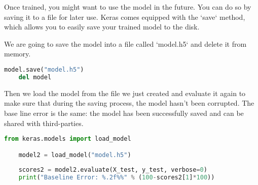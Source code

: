 Once trained, you might want to use the model in the future. You can do so by saving it to a file for later use. Keras comes equipped with the `save` method, which allows you to easily save your trained model to the disk.

We are going to save the model into a file called `model.h5` and delete it from memory.

\begin{lstlisting}[language=Python]
    model.save("model.h5")
    del model    
\end{lstlisting}

Then we load the model from the file we just created and evaluate it again to make sure that during the saving process, the model hasn't been corrupted. The base line error is the same: the model has been successfully saved and can be shared with third-parties. 

\begin{lstlisting}[language=Python]
    from keras.models import load_model

    model2 = load_model("model.h5")
    
    scores2 = model2.evaluate(X_test, y_test, verbose=0)
    print("Baseline Error: %.2f%%" % (100-scores2[1]*100))    
\end{lstlisting}
